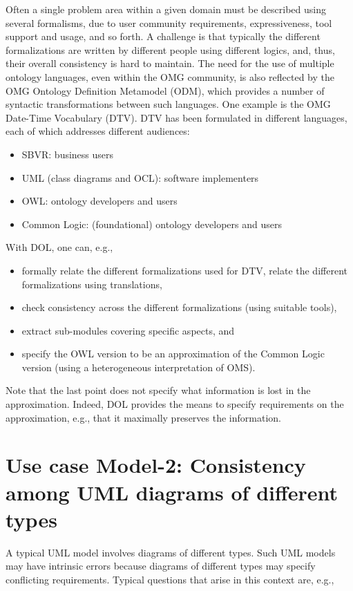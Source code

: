 \documentclass[10pt,fleqn,%
\ifpretendfinal
final%
\else
draft%
\fi,
]{scrreprt}
\begin{document}
Often a single problem area within a given domain must be described using several formalisms, due to user community requirements, expressiveness, tool support 
and usage, and so forth. A challenge is that typically the different formalizations are written by different people using different logics, and, thus, their overall 
consistency is hard to maintain.
The need for the use of multiple ontology languages, even within the OMG community, is also reflected by the OMG Ontology Definition Metamodel (ODM), which 
provides a number of syntactic transformations between such languages.
One example is the OMG Date-Time Vocabulary (DTV). DTV has been formulated in different languages, each of which addresses different audiences:
\begin{itemize}
\item	 SBVR: business users
\item 	UML (class diagrams and OCL): software implementers
\item 	OWL: ontology developers and users
\item 	Common Logic: (foundational) ontology developers and users
\end{itemize}
With DOL, one can, e.g.,
\begin{itemize}
\item 	formally relate the different formalizations used for DTV, relate the different formalizations using translations,
\item 	check consistency across the different formalizations (using suitable tools),
\item 	extract sub-modules covering specific aspects, and
\item 	specify the OWL version to be an approximation of the Common Logic version (using a heterogeneous interpretation of OMS).
\end{itemize}
Note that the last point does not specify what information is lost in the approximation. Indeed, DOL provides the means to specify requirements on the approximation, e.g., that it maximally preserves the information. 

\section{Use case Model-2: Consistency among UML diagrams of different types}

A typical UML model involves diagrams of different types. Such UML models may have intrinsic errors because diagrams of different types may specify conflicting 
requirements. Typical questions that arise in this context are, e.g.,
\end{document}
